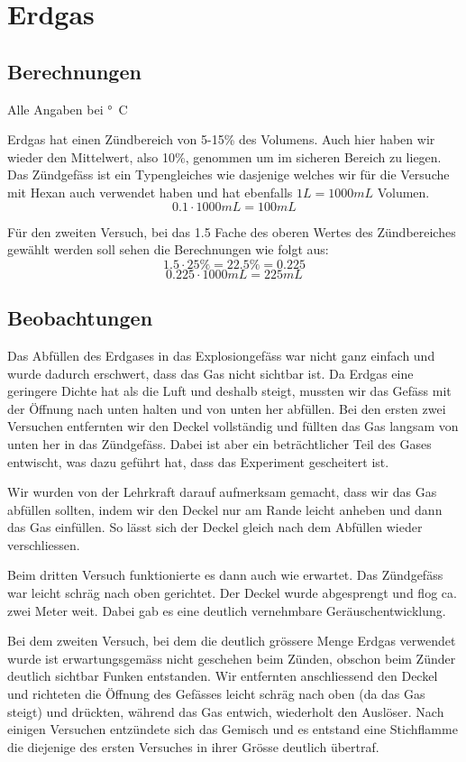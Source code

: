 \documentclass[11pt,paper=a4,final]{scrartcl}
\begin{document}
\section{Erdgas}
\subsection{Berechnungen}
Alle Angaben bei \unit[20]{°C}

Erdgas hat einen Z\"undbereich von 5-15\% des Volumens. Auch hier haben wir
wieder den Mittelwert, also 10\%, genommen um im sicheren Bereich zu liegen. Das
Z\"undgef\"ass ist ein Typengleiches wie dasjenige welches wir f\"ur die
Versuche mit Hexan auch verwendet haben und hat ebenfalls \(1L = 1000mL\)
Volumen.
\[ 0.1 \cdot 1000mL = 100mL \]

F\"ur den zweiten Versuch, bei das 1.5 Fache des oberen Wertes des
Z\"undbereiches gew\"ahlt werden soll sehen die Berechnungen wie folgt aus:
\[ 1.5 \cdot 25\% = 22.5\% = 0.225 \]
\[ 0.225 \cdot 1000mL = 225mL \]
\subsection{Beobachtungen}
Das Abf\"ullen des Erdgases in das Explosiongef\"ass war nicht ganz einfach und
wurde dadurch erschwert, dass das Gas nicht sichtbar ist. Da Erdgas eine
geringere Dichte hat als die Luft und deshalb steigt, mussten wir das Gef\"ass
mit der \"Offnung nach unten halten und von unten her abf\"ullen. Bei den ersten
zwei Versuchen entfernten wir den Deckel vollst\"andig und f\"ullten das Gas
langsam von unten her in das Z\"undgef\"ass. Dabei ist aber ein betr\"achtlicher
Teil des Gases entwischt, was dazu gef\"uhrt hat, dass das Experiment
gescheitert ist.

Wir wurden von der Lehrkraft darauf aufmerksam gemacht, dass wir das Gas
abf\"ullen sollten, indem wir den Deckel nur am Rande leicht anheben und dann
das Gas einf\"ullen. So l\"asst sich der Deckel gleich nach dem Abf\"ullen
wieder verschliessen.

Beim dritten Versuch funktionierte es dann auch wie erwartet. Das Z\"undgef\"ass
war leicht schr\"ag nach oben gerichtet. Der Deckel wurde \glqq abgesprengt\grqq
und flog ca. zwei Meter weit. Dabei gab es eine deutlich vernehmbare
Ger\"auschentwicklung.

Bei dem zweiten Versuch, bei dem die deutlich gr\"ossere Menge Erdgas verwendet
wurde ist erwartungsgem\"ass nicht geschehen beim Z\"unden, obschon beim
Z\"under deutlich sichtbar Funken entstanden. Wir entfernten anschliessend den
Deckel und richteten die \"Offnung des Gef\"asses leicht schr\"ag nach oben (da
das Gas steigt) und dr\"uckten, w\"ahrend das Gas entwich, wiederholt den
Ausl\"oser. Nach einigen Versuchen entz\"undete sich das Gemisch und es entstand
eine Stichflamme die diejenige des ersten Versuches in ihrer Gr\"osse deutlich
\"ubertraf.
\end{document}
